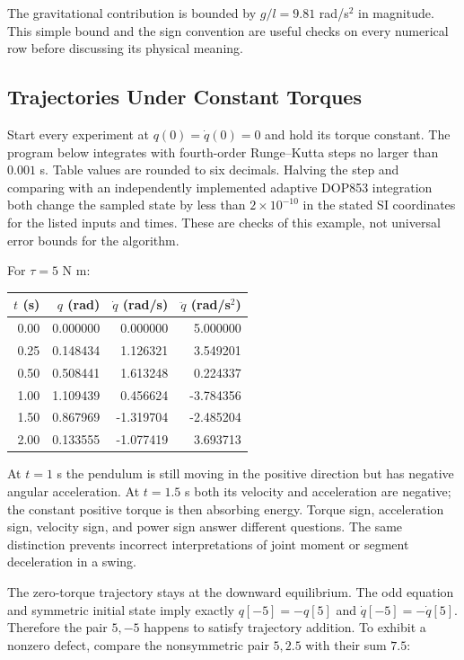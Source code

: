 The gravitational contribution is bounded by $g/l=9.81$ rad/s$^2$ in magnitude. This simple bound and the sign convention are useful checks on every numerical row before discussing its physical meaning.

\subsection{Trajectories Under Constant Torques}

Start every experiment at $q(0)=\dot q(0)=0$ and hold its torque constant. The program below integrates with fourth-order Runge--Kutta steps no larger than $0.001$ s. Table values are rounded to six decimals. Halving the step and comparing with an independently implemented adaptive DOP853 integration both change the sampled state by less than $2\times10^{-10}$ in the stated SI coordinates for the listed inputs and times. These are checks of this example, not universal error bounds for the algorithm.

For $\tau=5$ N m:

\begin{center}
\small
\begin{tabular}{rrrr}
\toprule
$t$ (s) & $q$ (rad) & $\dot q$ (rad/s) & $\ddot q$ (rad/s$^2$) \\
\midrule
0.00 & 0.000000 & 0.000000 & 5.000000 \\
0.25 & 0.148434 & 1.126321 & 3.549201 \\
0.50 & 0.508441 & 1.613248 & 0.224337 \\
1.00 & 1.109439 & 0.456624 & -3.784356 \\
1.50 & 0.867969 & -1.319704 & -2.485204 \\
2.00 & 0.133555 & -1.077419 & 3.693713 \\
\bottomrule
\end{tabular}
\end{center}

At $t=1$ s the pendulum is still moving in the positive direction but has negative angular acceleration. At $t=1.5$ s both its velocity and acceleration are negative; the constant positive torque is then absorbing energy. Torque sign, acceleration sign, velocity sign, and power sign answer different questions. The same distinction prevents incorrect interpretations of joint moment or segment deceleration in a swing.

The zero-torque trajectory stays at the downward equilibrium. The odd equation and symmetric initial state imply exactly $q[-5]=-q[5]$ and $\dot q[-5]=-\dot q[5]$. Therefore the pair $5,-5$ happens to satisfy trajectory addition. To exhibit a nonzero defect, compare the nonsymmetric pair $5,2.5$ with their sum $7.5$:

